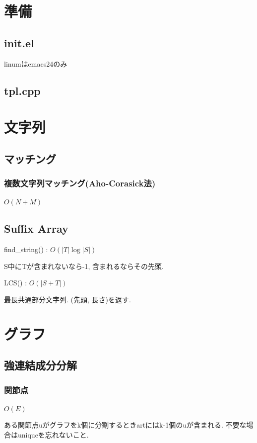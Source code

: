 \documentclass[9pt,twocolumn,a4paper,landscape]{extarticle}
\begin{document}
\tableofcontents
\newpage
%
%
\section{準備}
\subsection{init.el}
linumはemacs24のみ\par


\subsection{tpl.cpp}


\section{文字列}
\subsection{マッチング}
\subsubsection{複数文字列マッチング(Aho-Corasick法)}
$O(N+M)$\par


\subsection{Suffix Array}
find\_string() : $O(|T|\log |S|)$\par
S中にTが含まれないなら-1, 含まれるならその先頭.\par
LCS() : $O(|S+T|)$\par
最長共通部分文字列. (先頭, 長さ)を返す.



\section{グラフ}
\subsection{強連結成分分解}
\subsubsection{関節点}
$O(E)$\par
ある関節点uがグラフをk個に分割するときartにはk-1個のuが含まれる. 不要な場合はuniqueを忘れないこと.\par

\end{document}
